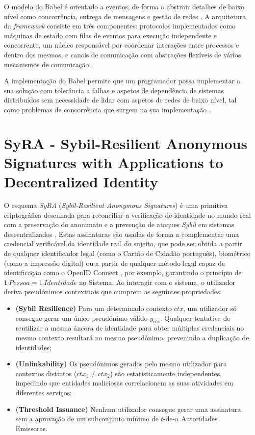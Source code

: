 O modelo do Babel é orientado a eventos, de forma a abstrair detalhes de baixo nível como concorrência, entrega de mensagens e gestão de redes \cite{pereira2025decentralized}. A arquitetura da \textit{framework} consiste em três componentes: protocolos implementados como máquinas de estado com filas de eventos para execução independente e concorrente, um núcleo responsável por coordenar interações entre processos e dentro dos mesmos, e canais de comunicação com abstrações flexíveis de vários mecanismos de comunicação \cite{pereira2025decentralized}.

A implementação do Babel permite que um programador possa implementar a sua solução com tolerância a falhas e aspetos de dependência de sistemas distribuídos sem necessidade de lidar com aspetos de redes de baixo nível, tal como problemas de concorrência que surgem na sua implementação \cite{fouto2022babel}.

\section{SyRA - Sybil-Resilient Anonymous Signatures with Applications to Decentralized Identity}

O esquema \textit{SyRA} (\textit{Sybil-Resilient Anonymous Signatures}) é uma primitiva criptográfica desenhada para reconciliar a verificação de identidade no mundo real com a preservação do anonimato e a prevenção de ataques \textit{Sybil} em sistemas descentralizados \cite{crites2025syra}. Estas assinaturas são usadas de forma a complementar uma credencial verificável da identidade real do sujeito, que pode ser obtida a partir de qualquer identificador legal (como o Cartão de Cidadão português), biométrico (como a impressão digital) ou a partir de qualquer método legal capaz de identificação como o OpenID Connect \cite{openid_connect}, por exemplo, garantindo o princípio de $1\ Pessoa = 1\ Identidade$ no Sistema. Ao interagir com o sistema, o utilizador deriva pseudónimos contextuais que cumprem as seguintes propriedades:

\begin{itemize}
    \item \textbf{(Sybil Resilience)} Para um determinado contexto $ctx$, um utilizador só consegue gerar um único pseudónimo válido $y_{ctx}$. Qualquer tentativa de reutilizar a mesma âncora de identidade para obter múltiplas credenciais no mesmo contexto resultará no mesmo pseudónimo, prevenindo a duplicação de identidades;
    \item \textbf{(Unlinkability)} Os pseudónimos gerados pelo mesmo utilizador para contextos distintos ($ctx_1 \neq ctx_2$) são estatisticamente independentes, impedindo que entidades maliciosas correlacionem as suas atividades em diferentes serviços;
    \item \textbf{(Threshold Issuance)} Nenhum utilizador consegue gerar uma assinatura sem a aprovação de um subconjunto mínimo de $t$-de-$n$ Autoridades Emissoras.
\end{itemize}

